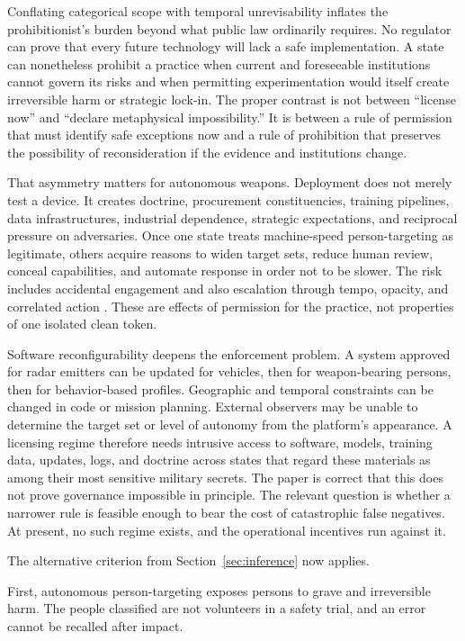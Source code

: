 \documentclass[11pt]{article}
\begin{document}
Conflating categorical scope with temporal unrevisability inflates the prohibitionist's burden beyond what public law ordinarily requires. No regulator can prove that every future technology will lack a safe implementation. A state can nonetheless prohibit a practice when current and foreseeable institutions cannot govern its risks and when permitting experimentation would itself create irreversible harm or strategic lock-in. The proper contrast is not between ``license now'' and ``declare metaphysical impossibility.'' It is between a rule of permission that must identify safe exceptions now and a rule of prohibition that preserves the possibility of reconsideration if the evidence and institutions change.

That asymmetry matters for autonomous weapons. Deployment does not merely test a device. It creates doctrine, procurement constituencies, training pipelines, data infrastructures, industrial dependence, strategic expectations, and reciprocal pressure on adversaries. Once one state treats machine-speed person-targeting as legitimate, others acquire reasons to widen target sets, reduce human review, conceal capabilities, and automate response in order not to be slower. The risk includes accidental engagement and also escalation through tempo, opacity, and correlated action \citep{altmann2017, icrc2021}. These are effects of permission for the practice, not properties of one isolated clean token.

Software reconfigurability deepens the enforcement problem. A system approved for radar emitters can be updated for vehicles, then for weapon-bearing persons, then for behavior-based profiles. Geographic and temporal constraints can be changed in code or mission planning. External observers may be unable to determine the target set or level of autonomy from the platform's appearance. A licensing regime therefore needs intrusive access to software, models, training data, updates, logs, and doctrine across states that regard these materials as among their most sensitive military secrets. The paper is correct that this does not prove governance impossible in principle. The relevant question is whether a narrower rule is feasible enough to bear the cost of catastrophic false negatives. At present, no such regime exists, and the operational incentives run against it.

The alternative criterion from Section~\ref{sec:inference} now applies.

First, autonomous person-targeting exposes persons to grave and irreversible harm. The people classified are not volunteers in a safety trial, and an error cannot be recalled after impact.
\end{document}
